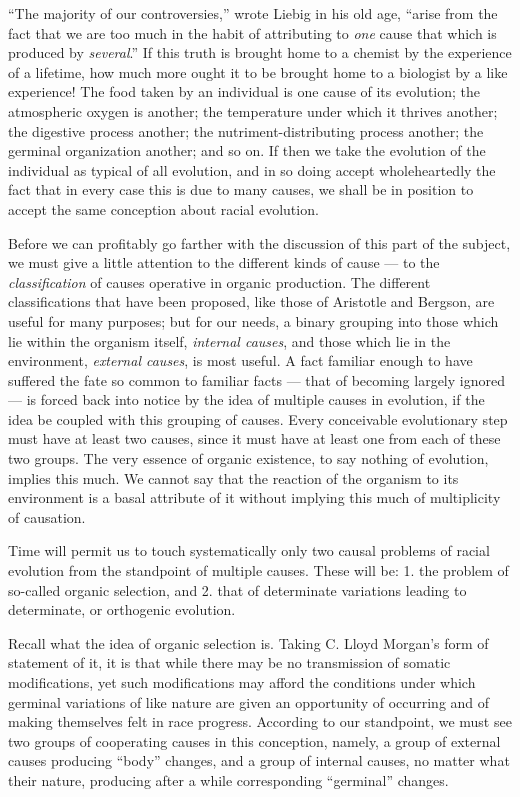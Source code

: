 \documentclass[a4paper, 11pt, oneside, polutonikogreek, english, landscape]{article}
\begin{document}
``The majority of our controversies,'' wrote Liebig in his old age, ``arise from the fact that we are too much in the habit of attributing to \emph{one} cause that which is produced by \emph{several}.'' If this truth is brought home to a chemist by the experience of a lifetime, how much more ought it to be brought home to a biologist by a like experience! The food taken by an individual is one cause of its evolution; the atmospheric oxygen is another; the temperature under which it thrives another; the digestive process another; the nutriment-distributing process another; the germinal organization another; and so on. If then we take the evolution of the individual as typical of all evolution, and in so doing accept wholeheartedly the fact that in every case this is due to many causes, we shall be in position to accept the same conception about racial evolution.

Before we can profitably go farther with the discussion of this part of the subject, we must give a little attention to the different kinds of cause --- to the \emph{classification} of causes operative in organic production. The different classifications that have been proposed, like those of Aristotle and Bergson, are useful for many purposes; but for our needs, a binary grouping into those which lie within the organism itself, \emph{internal causes}, and those which lie in the environment, \emph{external causes}, is most useful. A fact familiar enough to have suffered the fate so common to familiar facts --- that of becoming largely ignored --- is forced back into notice by the idea of multiple causes in evolution, if the idea be coupled with this grouping of causes. Every conceivable evolutionary step must have at least two causes, since it must have at least one from each of these two groups. The very essence of organic existence, to say nothing of evolution, implies this much. We cannot say that the reaction of the organism to its environment is a basal attribute of it without implying this much of multiplicity of causation.

Time will permit us to touch systematically only two causal problems of racial evolution from the standpoint of multiple causes. These will be: 1. the problem of so-called organic selection, and 2. that of determinate variations leading to determinate, or orthogenic evolution.

Recall what the idea of organic selection is. Taking C. Lloyd Morgan's form of statement of it, it is that while there may be no transmission of somatic modifications, yet such modifications may afford the conditions under which germinal variations of like nature are given an opportunity of occurring and of making themselves felt in race progress. According to our standpoint, we must see two groups of cooperating causes in this conception, namely, a group of external causes producing ``body'' changes, and a group of internal causes, no matter what their nature, producing after a while corresponding ``germinal'' changes.
\end{document}
